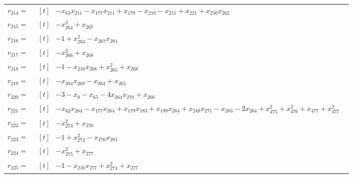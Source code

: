 \begin{longtable}{@{}r p{0.92\linewidth}@{}}
$r_{214}=$ & $\begin{aligned}[t]&-x_{62}x_{211}-x_{177}x_{211}+x_{179}-x_{210}-x_{211}+x_{221}+x_{250}x_{262}\end{aligned}$ \\[2pt]
$r_{215}=$ & $\begin{aligned}[t]&-x_{264}^{2}+x_{267}\end{aligned}$ \\[2pt]
$r_{216}=$ & $\begin{aligned}[t]&-1+x_{263}^{2}-x_{267}x_{281}\end{aligned}$ \\[2pt]
$r_{217}=$ & $\begin{aligned}[t]&-x_{266}^{2}+x_{268}\end{aligned}$ \\[2pt]
$r_{218}=$ & $\begin{aligned}[t]&-1-x_{216}x_{268}+x_{265}^{2}+x_{268}\end{aligned}$ \\[2pt]
$r_{219}=$ & $\begin{aligned}[t]&-x_{204}x_{269}-x_{263}+x_{265}\end{aligned}$ \\[2pt]
$r_{220}=$ & $\begin{aligned}[t]&-3-x_{0}-x_{65}-4x_{264}x_{270}+x_{266}\end{aligned}$ \\[2pt]
$r_{221}=$ & $\begin{aligned}[t]&-x_{62}x_{264}-x_{177}x_{264}+x_{179}x_{183}+x_{199}x_{264}+x_{248}x_{271}-x_{263}-2x_{264}+x_{475}^{2}+x_{476}^{2}+x_{477}+x_{477}^{2}\end{aligned}$ \\[2pt]
$r_{222}=$ & $\begin{aligned}[t]&-x_{273}^{2}+x_{276}\end{aligned}$ \\[2pt]
$r_{223}=$ & $\begin{aligned}[t]&-1+x_{272}^{2}-x_{276}x_{281}\end{aligned}$ \\[2pt]
$r_{224}=$ & $\begin{aligned}[t]&-x_{275}^{2}+x_{277}\end{aligned}$ \\[2pt]
$r_{225}=$ & $\begin{aligned}[t]&-1-x_{216}x_{277}+x_{274}^{2}+x_{277}\end{aligned}$ \\[2pt]

\end{longtable}
